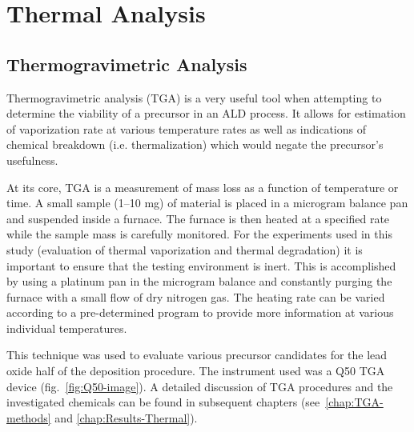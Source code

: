 \section{Thermal Analysis}


\subsection{Thermogravimetric Analysis}

Thermogravimetric analysis (TGA) is a very useful tool when attempting to determine the viability of a precursor in an ALD process. It allows for estimation of vaporization rate at various temperature rates as well as indications of chemical breakdown (i.e. thermalization) which would negate the precursor's usefulness. 

At its core, TGA is a measurement of mass loss as a function of temperature or time. A small sample (1--10 mg) of material is placed in a microgram balance pan and suspended inside a furnace. The furnace is then heated at a specified rate while the sample mass is carefully monitored. For the experiments used in this study (evaluation of thermal vaporization and thermal degradation) it is important to ensure that the testing environment is inert. This is accomplished by using a platinum pan in the microgram balance and constantly purging the furnace with a small flow of dry nitrogen gas. The heating rate can be varied according to a pre-determined program to provide more information at various individual temperatures. 

This technique was used to evaluate various precursor candidates for the lead oxide half of the \PTO deposition procedure. The instrument used was a Q50 TGA device (fig.~\vref{fig:Q50-image}).  A detailed discussion of TGA procedures and the investigated chemicals can be found in subsequent chapters (see~\vref{chap:TGA-methods} and \vref{chap:Results-Thermal}). 

